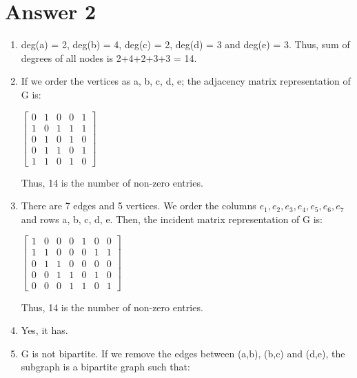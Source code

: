 \documentclass[12pt]{article}
\begin{document}
\section*{Answer 2}
\renewcommand{\labelenumi}{\textbf{\alph{enumi}.}}
\begin{enumerate}
    \item deg(a) = 2, deg(b) = 4, deg(c) = 2, deg(d) = 3 and deg(e) = 3. Thus, sum of degrees of all nodes is 2+4+2+3+3 = 14.
    \item If we order the vertices as a, b, c, d, e; the adjacency matrix representation of G is:
    \begin{center}
    $\begin{bmatrix}
    0 & 1 & 0 & 0 & 1\\
    1 & 0 & 1 & 1 & 1\\
    0 & 1 & 0 & 1 & 0\\
    0 & 1 & 1 & 0 & 1\\
    1 & 1 & 0 & 1 & 0
    \end{bmatrix}$
    \end{center}
    Thus, 14 is the number of non-zero entries.
    \item There are 7 edges and 5 vertices. We order the columns $e_1, e_2, e_3, e_4, e_5, e_6, e_7$ and rows a, b, c, d, e. Then, the incident matrix representation of G is:
    \begin{center}
        $\begin{bmatrix}
        1 & 0 & 0 & 0 & 1 & 0 & 0\\
        1 & 1 & 0 & 0 & 0 & 1 & 1\\
        0 & 1 & 1 & 0 & 0 & 0 & 0\\
        0 & 0 & 1 & 1 & 0 & 1 & 0\\
        0 & 0 & 0 & 1 & 1 & 0 & 1
        \end{bmatrix}$
    \end{center}
    Thus, 14 is the number of non-zero entries.
    \item Yes, it has.
    \begin{center}
    \end{center}
    \item G is not bipartite. If we remove the edges between (a,b), (b,c) and (d,e), the subgraph is a bipartite graph such that: 

\end{enumerate}
\end{document}
